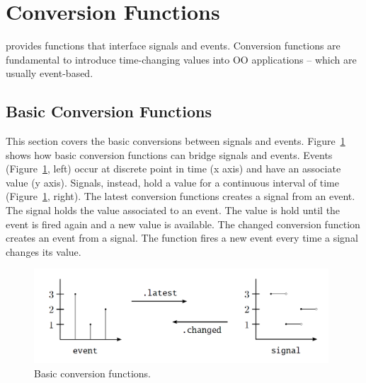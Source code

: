 \documentclass[10pt,a4paper]{article}
\newcommand{\code}[1]{{\fontfamily{cmtt}\small\selectfont#1}}
\newcommand{\REScala}{{\small \sc{REScala}}\xspace}
\begin{document}
\newpage



\section{Conversion Functions}\label{sec:conv-fun}

\REScala provides functions that interface signals and
events. Conversion functions are fundamental to introduce
time-changing values into OO applications -- which are usually
event-based.



\subsection{Basic Conversion Functions}

This section covers the basic conversions between signals and events.
Figure~\ref{fig:event-signal} shows how basic conversion functions can
bridge signals and events. Events (Figure~\ref{fig:event-signal},
left) occur at discrete point in time (x axis) and have an associate
value (y axis). Signals, instead, hold a value for a continuous
interval of time (Figure~\ref{fig:event-signal}, right). The
\code{latest} conversion functions creates a signal from an event. The
signal holds the value associated to an event. The value is hold until
the event is fired again and a new value is available. The
\code{changed} conversion function creates an event from a signal. The
function fires a new event every time a signal changes its value.



\begin{figure}[tp]
\begin{center}
  \includegraphics[width=0.98\textwidth]{images/event-signal.png}
\end{center}
\vspace{-6mm}
\caption{Basic conversion functions.}
\label{fig:event-signal}
\end{figure}
\end{document}

